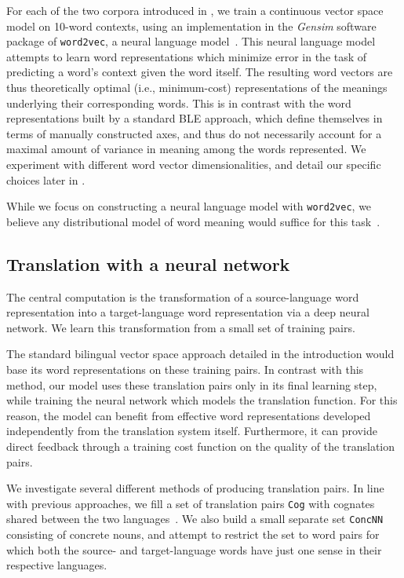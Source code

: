 \documentclass[11pt]{article}
\begin{document}
For each of the two corpora introduced in , we train a continuous
vector space model on 10-word contexts, using an implementation in the
\textit{Gensim} software package of \texttt{word2vec}, a neural language
model~\cite{rehurek2010,mikolov2013}. This neural language model attempts to
learn word representations which minimize error in the task of predicting a
word's context given the word itself. The resulting word vectors are thus
theoretically optimal (i.e., minimum-cost) representations of the meanings
underlying their corresponding words. This is in contrast with the word
representations built by a standard BLE approach, which define themselves in
terms of manually constructed axes, and thus do not necessarily account for a
maximal amount of variance in meaning among the words represented. We experiment
with different word vector dimensionalities, and detail our specific choices
later in .

While we focus on constructing a neural language model with \texttt{word2vec},
we believe any distributional model of word meaning would suffice for this
task~\cite{bengio2003,turian2010,collobert2011}.

\subsection{Translation with a neural network}
\label{subsec:translation-nn}

The central computation is the transformation of a source-language word
representation into a target-language word representation via a deep neural
network. We learn this transformation from a small set of training pairs.

The standard bilingual vector space approach detailed in the introduction would
base its word representations on these training pairs. In contrast with this
method, our model uses these translation pairs only in its final learning step,
while training the neural network which models the translation function. For
this reason, the model can benefit from effective word representations developed
independently from the translation system itself. Furthermore, it can provide
direct feedback through a training cost function on the quality of the
translation pairs.

We investigate several different methods of producing translation pairs. In line
with previous approaches, we fill a set of translation pairs \texttt{Cog} with
cognates shared between the two languages~\cite{koehn2002}. We also build a
small separate set \texttt{ConcNN} consisting of concrete nouns, and attempt to
restrict the set to word pairs for which both the source- and target-language
words have just one sense in their respective languages.
\end{document}
